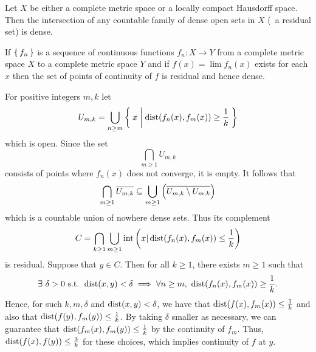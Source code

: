 \documentclass[letterpaper, 11pt, oneside]{book}
\begin{document}
\begin{cor}
  Let $X$ be either a complete metric space or a locally compact Hausdorff space.
  Then the intersection of any countable family of dense open sets in $X$ (\ie\ a residual set) is dense.
\end{cor}

\begin{cor}
  If $\set{f_{n}}$ is a sequence of continuous functions $f_{n}\colon X \to Y$ from a complete metric space $X$ to a complete metric space $Y$ and if $f(x) = \lim f_{n}(x)$ exists for each $x$ then the set of points of continuity of $f$ is residual and hence dense.
\end{cor}
\begin{pf}
  For positive integers $m, k$ let
  \[
    U_{m, k} = \bigcup_{n \geq m} \Set{x | \operatorname{dist}(f_{n}(x), f_{m}(x)) \geq \frac{1}{k}}
  \]
  which is open.
  Since the set
  \[
    \bigcap_{m \geq 1} U_{m, k}
  \]
  consists of points where $f_{n}(x)$ does not converge, it is empty.
  It follows that
  \[
    \bigcap_{m \geq 1} \overline{U_{m, k}} \subseteq \bigcup_{m \geq 1} \pqty{\overline{U_{m, k} \setminus U_{m, k}}}
  \]
  which is a countable union of nowhere dense sets.
  Thus its complement
  \[
    C = \bigcap_{k \geq 1} \bigcup_{m \geq 1} \inte\pqty{x | \dist(f_{n}(x), f_{m}(x)) \leq \frac{1}{k}}
  \]
  is residual.
  Suppose that $y \in C$.
  Then for all $k \geq 1$, there exists $m \geq 1$ such that
  \[
    \exists~\delta > 0 \text{ s.t. } \operatorname{dist}(x, y) < \delta \implies \forall n \geq m,~ \operatorname{dist}(f_{n}(x), f_{m}(x)) \geq \frac{1}{k}.
  \]
  Hence, for such $k, m, \delta$ and $\operatorname{dist}(x, y) < \delta$, we have that $\operatorname{dist}(f(x), f_{m}(x)) \leq \frac{1}{k}$ and also that $\operatorname{dist}(f(y), f_{m}(y)) \leq \frac{1}{k}$.
  By taking $\delta$ smaller as necessary, we can guarantee that $\operatorname{dist}(f_{m}(x), f_{m}(y)) \leq \frac{1}{k}$ by the continuity of $f_{m}$.
  Thus, $\operatorname{dist}(f(x), f(y)) \leq \frac{3}{k}$ for these choices, which implies continuity of $f$ at $y$.
\end{pf}

\clearpage
\end{document}
